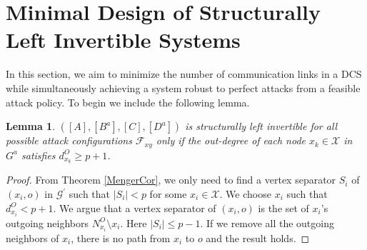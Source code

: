 \documentclass[letterpaper, 10 pt, conference]{ieeeconf}
\newtheorem{lemma}[theorem]{Lemma}
\begin{document}
\section{Minimal Design of Structurally Left Invertible Systems}
In this section, we aim to minimize the number of communication links in a DCS while simultaneously achieving a system robust to perfect attacks from a feasible attack policy. To begin we include the following lemma.
\begin{lemma}
 $([A],[B^a],[C],[D^a])$ is structurally left invertible for all possible attack configurations $\mathcal{F}_{xy}$ only if the out-degree of each node $x_k \in \mathcal{X}$ in $G^a$ satisfies $d_{x_k}^{O} \ge {p+1}$. \label{NECLEMMA}
\end{lemma}
\begin{proof}
From Theorem \ref{MengerCor}, we only need to find a vertex separator $S_i$ of $(x_i,o)$ in $\mathcal{G}^\prime$ such that $|S_i| < p$ for some $x_i \in \mathcal{X}$. We choose $x_i$ such that $d_{x_i}^{O} < {p+1}$. We argue that a vertex separator of $(x_i,o)$ is the set of $x_i$'s outgoing neighbors $N_{x_i}^O \setminus x_i$. Here $|S_i| \le p-1$. If we remove all the outgoing neighbors of $x_i$, there is no path from $x_i$ to $o$ and the result holds.
\end{proof}
\end{document}
